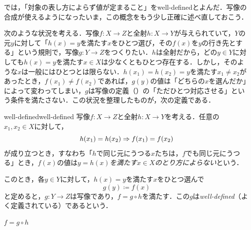 では，「対象の表し方によらず値が定まること」をwell-definedとよんだ．写像の合成が使えるようになったいま，この概念をもう少し正確に述べ直しておこう．

次のような状況を考える．写像$f \colon X \to Z$と全射$h \colon X \to Y$が与えられていて，$Y$の元$y$に対して「$h(x) = y$を満たす$x$をひとつ選び，その$f(x)$を$y$の行き先とする」という規則で，写像$g \colon Y \to Z$をつくりたい．$h$は全射だから，どの$y \in Y$に対しても$h(x) = y$を満たす$x \in X$は少なくともひとつ存在する．しかし，そのような$x$は一般にはひとつとは限らない．$h(x_1) = h(x_2) = y$を満たす$x_1 \ne x_2$があったとき，$f(x_1) \ne f(x_2)$であれば，$g(y)$の値は「どちらの$x$を選んだか」によって変わってしまい，$g$は写像の定義（）の「ただひとつ対応させる」という条件を満たさない．この状況を整理したものが，次の定義である．

\begin{definition}[
    sidebyside,
    righthand width=\mnsc{4.6cm},
    sidebyside gap=\mnsc{4mm},
  ]{well-defined}{well-defined}
  写像$f \colon X \to Z$と全射$h \colon X \to Y$を考える．任意の$x_1, x_2 \in X$に対して，
  \[
    h(x_1) = h(x_2) \mathrel{\Rightarrow} f(x_1) = f(x_2)
  \]
  が成り立つとき，すなわち「$h$で同じ元にうつる$x$たちは，$f$でも同じ元にうつる」とき，$f(x)$の値は\emph{$y = h(x)$を満たす$x \in X$のとり方によらない}という．

  このとき，各$y \in Y$に対して，$h(x) = y$を満たす$x$をひとつ選んで
  \[
    g(y) \coloneqq f(x)
  \]
  と定めると，$g \colon Y \to Z$は写像であり，$f = g \circ h$を満たす．この$g$は\emph{well-defined}（よく定義されている）であるという．

  \tcblower

  \centering
  \par\smallskip
  {\small $f = g \circ h$}
\end{definition}

